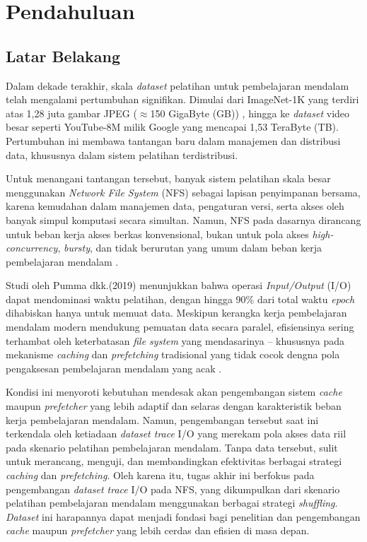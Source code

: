 \chapter{Pendahuluan}

\section{Latar Belakang}
\label{sec:latarbelakang}

Dalam dekade terakhir, skala \textit{dataset} pelatihan untuk pembelajaran mendalam telah mengalami pertumbuhan signifikan. Dimulai dari ImageNet-1K yang terdiri atas 1,28 juta gambar JPEG ($\approx$150 GigaByte (GB)) \parencite{AcceleratingDL}, hingga ke \textit{dataset} video besar seperti YouTube-8M milik Google yang mencapai 1,53 TeraByte (TB). Pertumbuhan ini membawa tantangan baru dalam manajemen dan distribusi data, khususnya dalam sistem pelatihan terdistribusi.

Untuk menangani tantangan tersebut, banyak sistem pelatihan skala besar menggunakan \textit{Network File System} (NFS) sebagai lapisan penyimpanan bersama, karena kemudahan dalam manajemen data, pengaturan versi, serta akses oleh banyak simpul komputasi secara simultan. Namun, NFS pada dasarnya dirancang untuk beban kerja akses berkas konvensional, bukan untuk pola akses \textit{high-concurrency}, \textit{bursty}, dan tidak berurutan yang umum dalam beban kerja pembelajaran mendalam \parencite{360survey}.

Studi oleh Pumma dkk.(2019) menunjukkan bahwa operasi \textit{Input/Output} (I/O) dapat mendominasi waktu pelatihan, dengan hingga 90\% dari total waktu \textit{epoch} dihabiskan hanya untuk memuat data. Meskipun kerangka kerja pembelajaran mendalam modern mendukung pemuatan data secara paralel, efisiensinya sering terhambat oleh keterbatasan \textit{file system} yang mendasarinya -- khususnya pada mekanisme \textit{caching} dan \textit{prefetching} tradisional yang tidak cocok dengna pola pengaksesan pembelajaran mendalam yang acak \parencite{BundleShuffle}.

Kondisi ini menyoroti kebutuhan mendesak akan pengembangan sistem \textit{cache} maupun \textit{prefetcher} yang lebih adaptif dan selaras dengan karakteristik beban kerja pembelajaran mendalam. Namun, pengembangan tersebut saat ini terkendala oleh ketiadaan \textit{dataset trace} I/O yang merekam pola akses data riil pada skenario pelatihan pembelajaran mendalam. Tanpa data tersebut, sulit untuk merancang, menguji, dan membandingkan efektivitas berbagai strategi \textit{caching} dan \textit{prefetching}. Oleh karena itu, tugas akhir ini berfokus pada pengembangan \textit{dataset trace} I/O pada NFS, yang dikumpulkan dari skenario pelatihan pembelajaran mendalam menggunakan berbagai strategi \textit{shuffling}. \textit{Dataset} ini harapannya dapat menjadi fondasi bagi penelitian dan pengembangan \textit{cache} maupun \textit{prefetcher} yang lebih cerdas dan efisien di masa depan.


